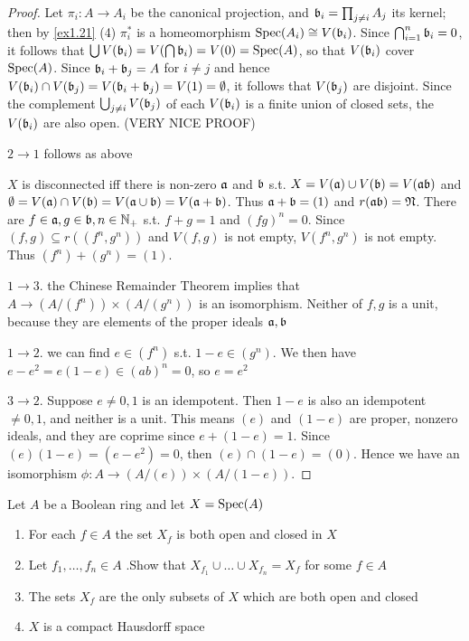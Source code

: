 \documentclass[11pt]{article}
\begin{document}
\begin{proof}
Let \(\pi_i:A\to A_i\) be the canonical projection, and \(\mathfrak{b}_i=\prod_{j\neq i}A_j\) its kernel; then by
\ref{ex1.21} (4) \(\pi^*_i\) is a homeomorphism \(\operatorname{Spec}(A_i)\cong V(\mathfrak{b}_i)\). Since \(\bigcap_{i=1}^n\mathfrak{b}_i=0\), it
follows that \(\bigcup V(\mathfrak{b}_i)=V(\bigcap\mathfrak{b}_i)=V(0)=\operatorname{Spec}(A)\), so that \(V(\mathfrak{b}_i)\) cover \(\operatorname{Spec}(A)\).
Since \(\mathfrak{b}_i+\mathfrak{b}_j=A\) for \(i\neq j\) and hence \(V(\mathfrak{b}_i)\cap V(\mathfrak{b}_j)=V(\mathfrak{b}_i+\mathfrak{b}_j)=V(1)=\emptyset\), it follows
that \(V(\mathfrak{b}_j)\) are disjoint. Since the complement \(\bigcup_{j\neq i}V(\mathfrak{b}_j)\) of each \(V(\mathfrak{b}_i)\) is a
finite union of closed sets, the \(V(\mathfrak{b}_i)\) are also open. (VERY NICE PROOF)

\(2\to 1\) follows as above

\(X\) is disconnected iff there is non-zero \(\mathfrak{a}\) and \(\mathfrak{b}\)
s.t. \(X=V(\mathfrak{a})\cup V(\mathfrak{b})=V(\mathfrak{a}\mathfrak{b})\) and \(\emptyset=V(\mathfrak{a})\cap V(\mathfrak{b})=V(\mathfrak{a}\cup\mathfrak{b})=V(\mathfrak{a}+\mathfrak{b})\). Thus \(\mathfrak{a}+\mathfrak{b}=(1)\)
and \(r(\mathfrak{a}\mathfrak{b})=\mathfrak{N}\). There are \(f\in\mathfrak{a},g\in\mathfrak{b},n\in\mathbb{N}_+\) s.t. \(f+g=1\) and \((fg)^n=0\).
Since \((f,g)\subseteq r((f^n,g^n))\) and \(V(f,g)\) is not empty, \(V(f^n,g^n)\) is not empty.
Thus \((f^n)+(g^n)=(1)\).

\(1\to 3\). the Chinese Remainder Theorem implies that \(A\to (A/(f^n))\times (A/(g^n))\)
is an isomorphism. Neither of \(f,g\) is a unit, because they are elements of the proper
ideals \(\mathfrak{a},\mathfrak{b}\)

\(1\to 2\). we can find  \(e\in(f^n)\) s.t. \(1-e\in(g^n)\). We then have \(e-e^2=e(1-e)\in(ab)^n=0\),
so \(e=e^2\)

\(3\to 2\). Suppose \(e\neq 0,1\) is an idempotent. Then \(1-e\) is also an idempotent \(\neq 0,1\), and
neither is a unit. This means \((e)\) and \((1-e)\) are proper, nonzero ideals, and they are
coprime since \(e+(1-e)=1\). Since \((e)(1-e)=(e-e^2)=0\), then \((e)\cap(1-e)=(0)\). Hence we have
an isomorphism \(\phi:A\to (A/(e))\times(A/(1-e))\).
\end{proof}

\begin{exercise}
Let \(A\) be a Boolean ring and let \(X=\operatorname{Spec}(A)\)
\begin{enumerate}
\item For each \(f\in A\) the set \(X_f\) is both open and closed in \(X\)
\item Let \(f_1,\dots,f_n\in A\) .Show that \(X_{f_1}\cup\dots\cup X_{f_n}=X_f\) for some \(f\in A\)
\item The sets \(X_f\) are the only subsets of \(X\) which are both open and closed
\item \(X\) is a compact Hausdorff space
\end{enumerate}
\end{exercise}
\end{document}
